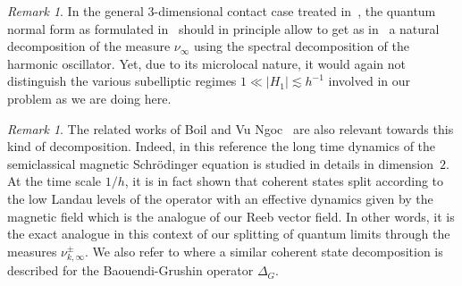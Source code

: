 \documentclass[10pt]{amsart}
\theoremstyle{plain}
\theoremstyle{definition}
\theoremstyle{remark}
\newtheorem{rema}[theo]{Remark}
\begin{document}
\begin{rema}
In the general $3$-dimensional contact case treated in~\cite{ColindeVerdiereHillairetTrelat15}, the quantum normal form as formulated in~\cite[\S6.2]{ColindeVerdiere2023} should in principle allow to get as in~\cite{FermanianFischer21} a natural decomposition of the measure $\nu_\infty$ using the spectral decomposition of the harmonic oscillator. Yet, due to its microlocal nature, it would again not distinguish the various subelliptic regimes $1\ll |H_1|\lesssim h^{-1}$ involved in our problem as we are doing here.
\end{rema}
\begin{rema} The related works of Boil and Vu Ngoc~\cite{BoilVuNgoc21} are also relevant towards this kind of decomposition. Indeed, in this reference the long time dynamics of the semiclassical magnetic Schrödinger equation is studied in details in dimension~$2$. At the time scale $1/h$, it is in fact shown that coherent states split according to the low Landau levels of the operator with an effective dynamics given by the magnetic field which is the analogue of our Reeb vector field. In other words, it is the exact analogue in this context of our splitting of quantum limits through the measures $\nu_{k,\infty}^\pm$. We also refer to \cite[\S5]{ArnaizSun22} where a similar coherent state decomposition is described for the Baouendi-Grushin operator $\Delta_G$.
\end{rema}
\end{document}
